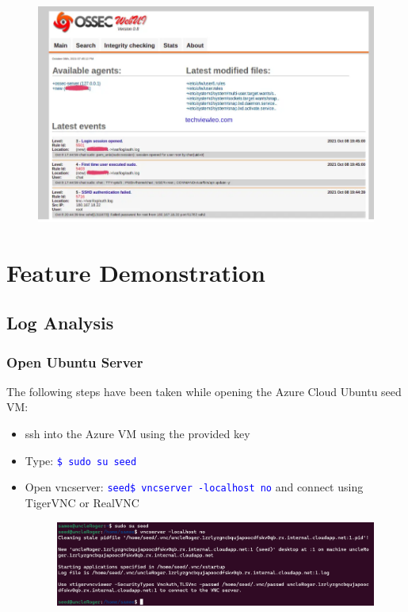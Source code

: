 \documentclass{article}
\begin{document}
\begin{figure}
\centering
    \includegraphics{Screenshot 2023-09-13 192918.png}
\end{figure}

\section{Feature Demonstration}

\subsection{Log Analysis}
\subsubsection{Open Ubuntu Server}
The following steps have been taken while opening the Azure Cloud Ubuntu seed VM:
\begin{itemize}
    \item ssh into the Azure VM using the provided key
    \item Type: \textcolor{blue}{\texttt{\$ sudo su seed}}
    \item Open vncserver: \textcolor{blue}{\texttt{seed\$ vncserver -localhost no}} and connect using TigerVNC or RealVNC
    \begin{figure}[hbt!]
        \centering
        \includegraphics[scale=0.4]{img-vncerver.PNG}
    \end{figure}
\end{itemize}
\end{document}
